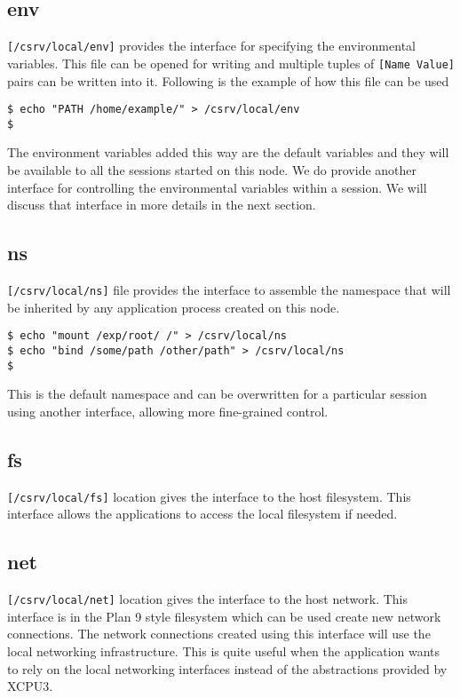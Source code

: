 \subsection{env} 
\texttt{[/csrv/local/env]} provides the interface for specifying the environmental
variables.  This file can be opened for writing and multiple tuples of \texttt{[Name Value]}
pairs can be written into it.  Following is the example of how this file can be used
\begin{verbatim}
$ echo "PATH /home/example/" > /csrv/local/env
$
\end{verbatim}
The environment variables added this way are the default variables and they will be 
available to all the sessions started on this node.  We do provide another interface
for controlling the environmental variables within a session.  We will discuss that interface in 
more details in the next section.

\subsection{ns} 
\texttt{[/csrv/local/ns]} file provides the interface to assemble the
namespace that will be inherited by any application process created on this node.
\begin{verbatim}
$ echo "mount /exp/root/ /" > /csrv/local/ns
$ echo "bind /some/path /other/path" > /csrv/local/ns
$ 
\end{verbatim}
This is the default namespace and can be overwritten for a particular session using another
interface, allowing more fine-grained control.

\subsection{fs} 
\texttt{[/csrv/local/fs]} location gives the interface to the host filesystem.
This interface allows the applications to access the local filesystem if needed.


\subsection{net} 
\texttt{[/csrv/local/net]} location gives the interface to the host network.
This interface is in the Plan 9 style filesystem which can be used create new network
connections\cite{net}.  The network connections created using this interface will use the local
networking infrastructure.  This is quite useful when the application wants to rely
on the local networking interfaces instead of the abstractions provided by XCPU3.

